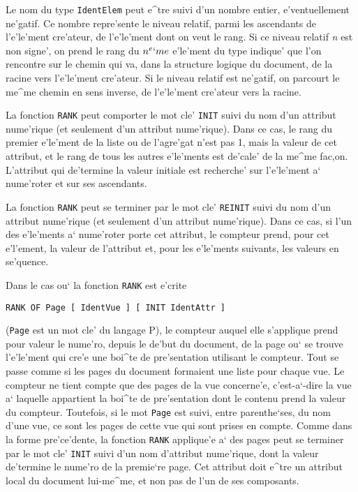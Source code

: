 {Le nom du type {\tt IdentElem} peut e^tre suivi d'un nombre entier,
e'ventuellement ne'gatif. Ce nombre repre'sente le niveau relatif, parmi
les ascendants de l'e'le'ment cre'ateur, de l'e'le'ment dont on veut le
rang. Si ce niveau relatif {\it n} est non signe', on prend le rang du $n^e`me$
e'le'ment du type indique' que l'on rencontre sur le chemin qui va, dans
la structure logique du document, de la racine vers l'e'le'ment cre'ateur.
Si le niveau relatif est ne'gatif, on parcourt le me^me chemin en sens inverse,
de l'e'le'ment cre'ateur vers la racine.

La fonction {\tt RANK} peut comporter le mot cle' {\tt INIT} suivi du nom d'un
attribut nume'rique (et seulement d'un attribut nume'rique). Dans ce cas,
le rang du premier e'le'ment de la liste ou de l'agre'gat n'est pas 1, mais
la valeur de cet attribut, et le rang de tous les
autres e'le'ments est de'cale' de la me^me fac,on. L'attribut qui de'termine
la valeur initiale est recherche' sur l'e'le'ment a` nume'roter et sur ses
ascendants.

La fonction {\tt RANK} peut se terminer par le mot cle' {\tt REINIT} suivi du
nom d'un attribut nume'rique (et seulement d'un attribut nume'rique). Dans ce
cas, si l'un des e'le'ments a` nume'roter porte cet attribut, le compteur
prend, pour cet e'l'ement, la valeur de l'attribut et, pour les e'le'ments
suivants, les valeurs en se'quence.

Dans le cas ou` la fonction {\tt RANK} est e'crite
\begin{verbatim}
RANK OF Page [ IdentVue ] [ INIT IdentAttr ]
\end{verbatim}
({\tt Page} est un mot cle' du langage P), le compteur auquel elle s'applique
prend pour valeur le nume'ro, depuis le de'but du document, de la page ou` se
trouve l'e'le'ment qui cre'e une boi^te de pre'sentation utilisant le compteur.
Tout se passe comme si les pages du document formaient une liste pour chaque
vue. Le compteur ne tient compte que des pages de la vue concerne'e,
c'est-a`-dire la vue a` laquelle appartient la boi^te de pre'sentation dont le
contenu prend la valeur du compteur. Toutefois, si le mot {\tt Page} est suivi,
entre parenthe`ses, du nom d'une vue, ce sont les pages de cette vue qui sont
prises en compte. Comme dans la forme pre'ce'dente, la fonction {\tt RANK}
applique'e a` des pages peut se terminer par le mot cle' {\tt INIT} suivi
d'un nom d'attribut nume'rique, dont la valeur de'termine le nume'ro de la
premie`re page. Cet attribut doit e^tre un attribut local du document
lui-me^me, et non pas de l'un de ses composants.

}
